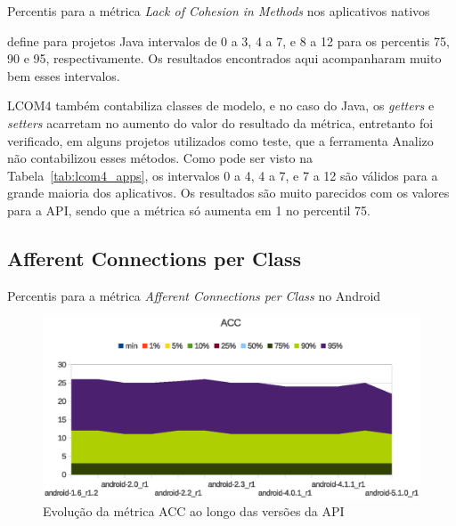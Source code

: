 \begin{table}[!htb]
\centering
{}

\caption{Percentis para a métrica \textit{Lack of Cohesion in Methods} nos aplicativos nativos}
\label{tab:lcom4_apps}
\end{table}

 define para projetos Java intervalos de 0 a 3, 4 a 7, e 8 a 12 para os percentis 75, 90 e 95, respectivamente. Os resultados encontrados aqui acompanharam muito bem esses intervalos.

LCOM4 também contabiliza classes de modelo, e no caso do Java, os \textit{getters} e \textit{setters} acarretam no aumento do valor do resultado da métrica\cite{meirelles2013}, entretanto foi verificado, em alguns projetos utilizados como teste, que a ferramenta Analizo não contabilizou esses métodos. Como pode ser visto na Tabela~\ref{tab:lcom4_apps}, os intervalos 0 a 4, 4 a 7, e 7 a 12 são válidos para a grande maioria dos aplicativos. Os resultados são muito parecidos com os valores para a API, sendo que a métrica só aumenta em 1 no percentil 75.

\subsection{Afferent Connections per Class}

\begin{table}[!htb]
\centering
{}

\caption{Percentis para a métrica \textit{Afferent Connections per Class} no Android}
\label{tab:acc_android}
\end{table}

\begin{figure}[!htb]
\centering
\includegraphics [keepaspectratio=true,scale=0.85]{figuras/graphs/acc_android.eps}
\caption{Evolução da métrica ACC ao longo das versões da API}
\label{fig:acc_android}
\end{figure}

